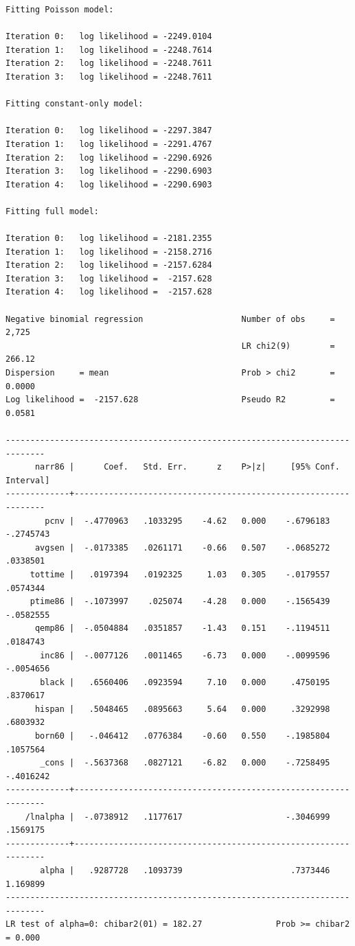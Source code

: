 \documentclass[
]{book}
\begin{document}
\begin{verbatim}
Fitting Poisson model:

Iteration 0:   log likelihood = -2249.0104  
Iteration 1:   log likelihood = -2248.7614  
Iteration 2:   log likelihood = -2248.7611  
Iteration 3:   log likelihood = -2248.7611  

Fitting constant-only model:

Iteration 0:   log likelihood = -2297.3847  
Iteration 1:   log likelihood = -2291.4767  
Iteration 2:   log likelihood = -2290.6926  
Iteration 3:   log likelihood = -2290.6903  
Iteration 4:   log likelihood = -2290.6903  

Fitting full model:

Iteration 0:   log likelihood = -2181.2355  
Iteration 1:   log likelihood = -2158.2716  
Iteration 2:   log likelihood = -2157.6284  
Iteration 3:   log likelihood =  -2157.628  
Iteration 4:   log likelihood =  -2157.628  

Negative binomial regression                    Number of obs     =      2,725
                                                LR chi2(9)        =     266.12
Dispersion     = mean                           Prob > chi2       =     0.0000
Log likelihood =  -2157.628                     Pseudo R2         =     0.0581

------------------------------------------------------------------------------
      narr86 |      Coef.   Std. Err.      z    P>|z|     [95% Conf. Interval]
-------------+----------------------------------------------------------------
        pcnv |  -.4770963   .1033295    -4.62   0.000    -.6796183   -.2745743
      avgsen |  -.0173385   .0261171    -0.66   0.507    -.0685272    .0338501
     tottime |   .0197394   .0192325     1.03   0.305    -.0179557    .0574344
     ptime86 |  -.1073997    .025074    -4.28   0.000    -.1565439   -.0582555
      qemp86 |  -.0504884   .0351857    -1.43   0.151    -.1194511    .0184743
       inc86 |  -.0077126   .0011465    -6.73   0.000    -.0099596   -.0054656
       black |   .6560406   .0923594     7.10   0.000     .4750195    .8370617
      hispan |   .5048465   .0895663     5.64   0.000     .3292998    .6803932
      born60 |   -.046412   .0776384    -0.60   0.550    -.1985804    .1057564
       _cons |  -.5637368   .0827121    -6.82   0.000    -.7258495   -.4016242
-------------+----------------------------------------------------------------
    /lnalpha |  -.0738912   .1177617                     -.3046999    .1569175
-------------+----------------------------------------------------------------
       alpha |   .9287728   .1093739                      .7373446    1.169899
------------------------------------------------------------------------------
LR test of alpha=0: chibar2(01) = 182.27               Prob >= chibar2 = 0.000
\end{verbatim}
\end{document}
